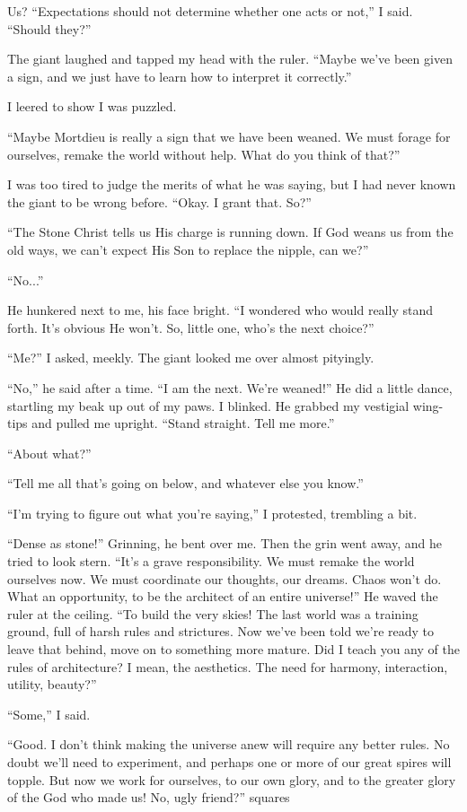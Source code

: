 Us? “Expectations should not determine whether one acts or not,” I said. “Should they?”

The giant laughed and tapped my head with the ruler. “Maybe we’ve been given a sign, and we just have to learn how to interpret it correctly.”

I leered to show I was puzzled.

“Maybe Mortdieu is really a sign that we have been weaned. We must forage for ourselves, remake the world without help. What do you think of that?”

I was too tired to judge the merits of what he was saying, but I had never known the giant to be wrong before. “Okay. I grant that. So?”

“The Stone Christ tells us His charge is running down. If God weans us from the old ways, we can’t expect His Son to replace the nipple, can we?”

“No...”

He hunkered next to me, his face bright. “I wondered who would really stand forth. It’s obvious He won’t. So, little one, who’s the next choice?”

“Me?” I asked, meekly. The giant looked me over almost pityingly.

“No,” he said after a time. “I am the next. We’re weaned!” He did a little dance, startling my beak up out of my paws. I blinked. He grabbed my vestigial wing-tips and pulled me upright. “Stand straight. Tell me more.”

“About what?”

“Tell me all that’s going on below, and whatever else you know.”

“I’m trying to figure out what you’re saying,” I protested, trembling a bit.

“Dense as stone!” Grinning, he bent over me. Then the grin went away, and he tried to look stern. “It’s a grave responsibility. We must remake the world ourselves now. We must coordinate our thoughts, our dreams. Chaos won’t do. What an opportunity, to be the architect of an entire universe!” He waved the ruler at the ceiling. “To build the very skies! The last world was a training ground, full of harsh rules and strictures. Now we’ve been told we’re ready to leave that behind, move on to something more mature. Did I teach you any of the rules of architecture? I mean, the aesthetics. The need for harmony, interaction, utility, beauty?”

“Some,” I said.

“Good. I don’t think making the universe anew will require any better rules. No doubt we’ll need to experiment, and perhaps one or more of our great spires will topple. But now we work for ourselves, to our own glory, and to the greater glory of the God who made us! No, ugly friend?”
squares

